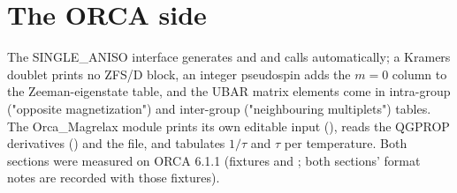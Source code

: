 \section{The ORCA side}

The SINGLE\_ANISO interface generates  and
 and calls  automatically; a
Kramers doublet prints no ZFS/D block, an integer pseudospin adds the $m=0$
column to the Zeeman-eigenstate table, and the UBAR matrix elements come in
intra-group ("opposite magnetization") and inter-group
("neighbouring multiplets") tables.  The Orca\_Magrelax module prints its
own editable input (), reads the QGPROP derivatives
() and the  file, and tabulates
$1/\tau$ and $\tau$ per temperature.  Both sections were measured on ORCA
6.1.1 (fixtures  and ; both sections'
format notes are recorded with those fixtures).
